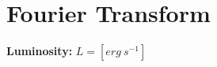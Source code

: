 \documentclass[11pt]{article}
\begin{document}
\section{Fourier Transform}

 {\bf Luminosity:} $L = [erg\ s^{-1}]$
\end{document}
